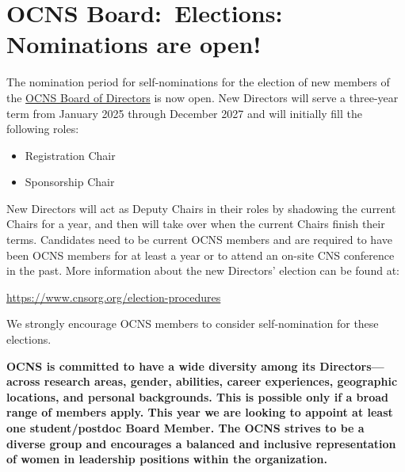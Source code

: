 \documentclass[11pt,a4paper,oneside]{article}
\begin{document}
\section*{OCNS Board:\ Elections: Nominations are open!}%
\sectionauthor{\vspace{-4ex}}
The nomination period for self-nominations for the election of new members of the \href{https://www.cnsorg.org/board-of-directors}{OCNS Board of Directors} is now open.
New Directors will serve a three-year term from January 2025 through December 2027 and will initially fill the following roles:
\begin{multicols}{2}
  \begin{itemize}
    \item Registration Chair
    \item Sponsorship Chair
  \end{itemize}
\end{multicols}

New Directors will act as Deputy Chairs in their roles by shadowing the current Chairs for a year, and then will take over when the current Chairs finish their terms.
Candidates need to be current OCNS members and are required to have been OCNS members for at least a year or to attend an on-site CNS conference in the past.
More information about the new Directors' election can be found at:

\begin{center}
\url{https://www.cnsorg.org/election-procedures}
\end{center}


We strongly encourage OCNS members to consider self-nomination for these elections.

\begin{tcolorbox}[colback=CornflowerBlue, colframe=black, width=\textwidth, boxrule=0.1mm]
\textbf{OCNS is committed to have a wide diversity among its Directors---across research areas, gender, abilities, career experiences, geographic locations, and personal backgrounds.
This is possible only if a broad range of members apply.
This year we are looking to appoint at least one student/postdoc Board Member.
The OCNS strives to be a diverse group and encourages a balanced and inclusive representation of women in leadership positions within the organization.}
\end{tcolorbox}
\end{document}
